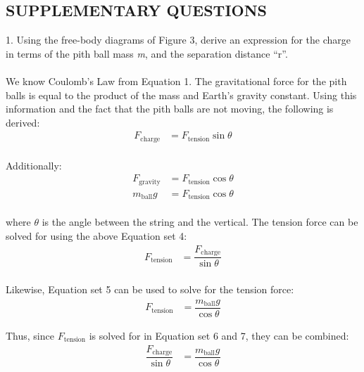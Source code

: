 \documentclass [12pt, letterpaper, twoside] {article}
\begin{document}
\subsection* {SUPPLEMENTARY QUESTIONS}
1. Using the free-body diagrams of Figure 3, derive an expression for the charge in terms of the pith ball mass \emph{m}, and the separation distance “r”. \\\\
We know Coulomb's Law from Equation 1. The gravitational force for the pith balls is equal to the product of the mass and Earth's gravity constant. Using this information and the fact that the pith balls are not moving, the following is derived:
\begin{equation}
  \begin{split}
    F_{\text{charge}} &= F_{\text{tension}}\sin{\theta} \\
  \end{split}
\end{equation}

\noindent
Additionally:
\begin{equation}
  \begin{split}
    F_{\text{gravity}} &= F_{\text{tension}}\cos{\theta} \\
    m_{\text{ball}}g &= F_{\text{tension}}\cos{\theta} \\
  \end{split}
\end{equation}

\noindent
where \(\theta\) is the angle between the string and the vertical. The tension force can be solved for using the above Equation set 4:
\begin{equation}
  \begin{split}
    F_{\text{tension}} &= \dfrac{F_{\text{charge}}}{\sin{\theta}} \\
  \end{split}
\end{equation}

\noindent
Likewise, Equation set 5 can be used to solve for the tension force:
\begin{equation}
  \begin{split}
    F_{\text{tension}} &= \dfrac{m_{\text{ball}}g}{\cos{\theta}}
  \end{split}
\end{equation}

\noindent
Thus, since \(F_{\text{tension}}\) is solved for in Equation set 6 and 7, they can be combined:
\begin{equation}
  \begin{split}
    \dfrac{F_{\text{charge}}}{\sin{\theta}} &= \dfrac{m_{\text{ball}}g}{\cos{\theta}} \\
  \end{split}
\end{equation}
\end{document}
